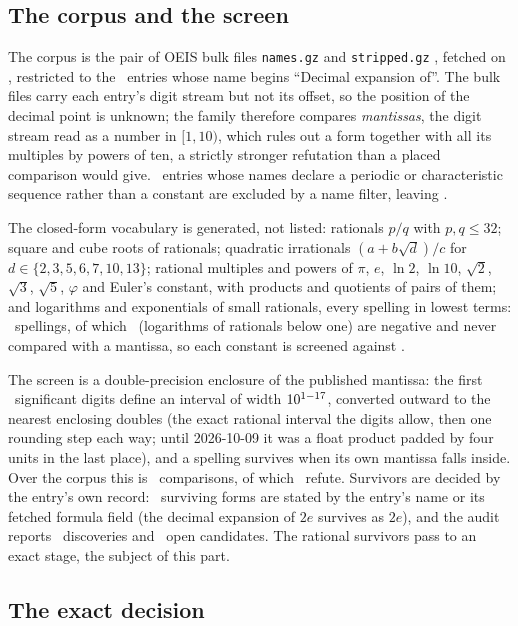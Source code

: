 \documentclass[11pt]{article}
\theoremstyle{definition}
\theoremstyle{plain}
\begin{document}
\subsection{The corpus and the screen}\label{sec:corpus}

The corpus is the pair of OEIS bulk files \texttt{names.gz} and \texttt{stripped.gz} \cite{OEIS}, fetched on \OeisPinned, restricted to the \OeisEntries\ entries whose name begins ``Decimal expansion of''. The bulk files carry each entry's digit stream but not its offset, so the position of the decimal point is unknown; the family therefore compares \emph{mantissas}, the digit stream read as a number in $[1,10)$, which rules out a form together with all its multiples by powers of ten, a strictly stronger refutation than a placed comparison would give. \OeisSkipped\ entries whose names declare a periodic or characteristic sequence rather than a constant are excluded by a name filter, leaving \OeisAudited.

The closed-form vocabulary is generated, not listed: rationals $p/q$ with $p,q\le32$; square and cube roots of rationals; quadratic irrationals $(a+b\sqrt d)/c$ for $d\in\{2,3,5,6,7,10,13\}$; rational multiples and powers of $\pi$, $e$, $\ln2$, $\ln10$, $\sqrt2$, $\sqrt3$, $\sqrt5$, $\varphi$ and Euler's constant, with products and quotients of pairs of them; and logarithms and exponentials of small rationals, every spelling in lowest terms: \VocabSize\ spellings, of which \FormsUntested\ (logarithms of rationals below one) are negative and never compared with a mantissa, so each constant is screened against \FormsTested.

The screen is a double-precision enclosure of the published mantissa: the first \ScreenDigits\ significant digits define an interval of width $10^{1-17}$, converted outward to the nearest enclosing doubles (the exact rational interval the digits allow, then one rounding step each way; until 2026-10-09 it was a float product padded by four units in the last place), and a spelling survives when its own mantissa falls inside. Over the corpus this is \DoubleTestedTotal\ comparisons, of which \DoubleRefuted\ refute. Survivors are decided by the entry's own record: \OeisOnRecord\ surviving forms are stated by the entry's name or its fetched formula field (the decimal expansion of $2e$ survives as $2e$), and the audit reports \OeisHits\ discoveries and \OeisOpen\ open candidates. The rational survivors pass to an exact stage, the subject of this part.

\subsection{The exact decision}\label{sec:exact}
\end{document}

